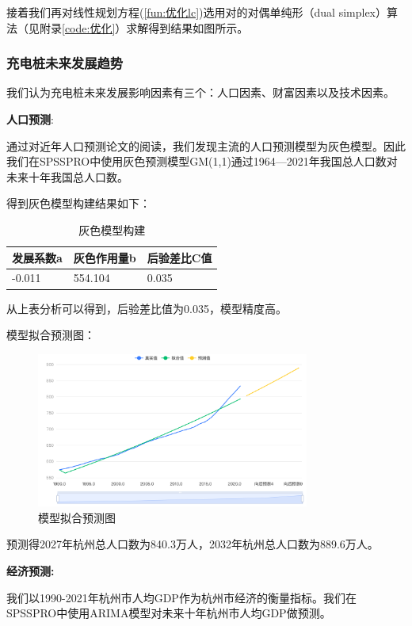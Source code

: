 \documentclass[12pt, a4paper, oneside]{ctexart}
\begin{document}
接着我们再对线性规划方程(\ref{fun:优化lc})选用对的对偶单纯形（dual simplex）算法（见附录\ref{code:优化}）求解得到结果如图所示。

\subsubsection{充电桩未来发展趋势}
我们认为充电桩未来发展影响因素有三个：人口因素、财富因素以及技术因素。

\textbf{人口预测}:

通过对近年人口预测论文的阅读，我们发现主流的人口预测模型为灰色模型。因此我们在SPSSPRO中使用灰色预测模型GM(1,1)通过1964---2021年我国总人口数对未来十年我国总人口数。

得到灰色模型构建结果如下：

\begin{table}[H]
  \centering
  \begin{tabularx}{0.9\textwidth}{XXX}
  \toprule
  发展系数a & 灰色作用量b & 后验差比C值 \\
  \midrule
  -0.011 & 554.104 & 0.035 \\
  \bottomrule
  \end{tabularx}
  \caption{灰色模型构建}
  \label{tab:grey}
\end{table}

从上表分析可以得到，后验差比值为0.035，模型精度高。

模型拟合预测图：
\begin{figure}[H]
  \centering
  \includegraphics[width=0.8\textwidth]{pic/模型拟合预测图.png}
  \caption{模型拟合预测图}
  \label{fig:模型拟合预测图}
\end{figure}



预测得2027年杭州总人口数为840.3万人，2032年杭州总人口数为889.6万人。

\textbf{经济预测:}

我们以1990-2021年杭州市人均GDP作为杭州市经济的衡量指标。我们在SPSSPRO中使用ARIMA模型对未来十年杭州市人均GDP做预测。
\end{document}
